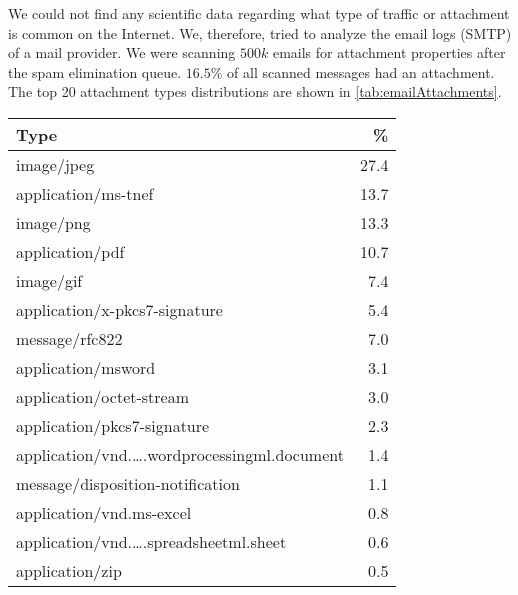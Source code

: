 We could not find any scientific data regarding what type of traffic or attachment is common on the Internet. We, therefore, tried to analyze the email logs (SMTP) of a mail provider. We were scanning $500k$ emails for attachment properties after the spam elimination queue. $16.5\%$ of all scanned messages had an attachment. The top 20 attachment types distributions are shown in \cref{tab:emailAttachments}.
\begin{table}[ht]
	
	\begin{tabular}{l|r}\hline
		Type                                                                        & \%\\\hline
		image/jpeg                                                                  &    27.4\\
		application/ms-tnef                                                         &    13.7\\
		image/png                                                                   &    13.3\\
		application/pdf                                                             &    10.7\\
		image/gif                                                                   &    7.4\\
		application/x-pkcs7-signature                                               &    5.4\\
		message/rfc822                                                              &    7.0\\
		application/msword                                                          &    3.1\\
		application/octet-stream                                                    &    3.0\\
		application/pkcs7-signature                                                 &    2.3\\
		application/vnd.\ldots.wordprocessingml.document                            &    1.4\\
		message/disposition-notification                                            &    1.1\\
		application/vnd.ms-excel                                                    &    0.8\\
		application/vnd.\ldots.spreadsheetml.sheet                                  &    0.6\\
		application/zip                                                             &    0.5\\

\end{tabular}
\end{table}
